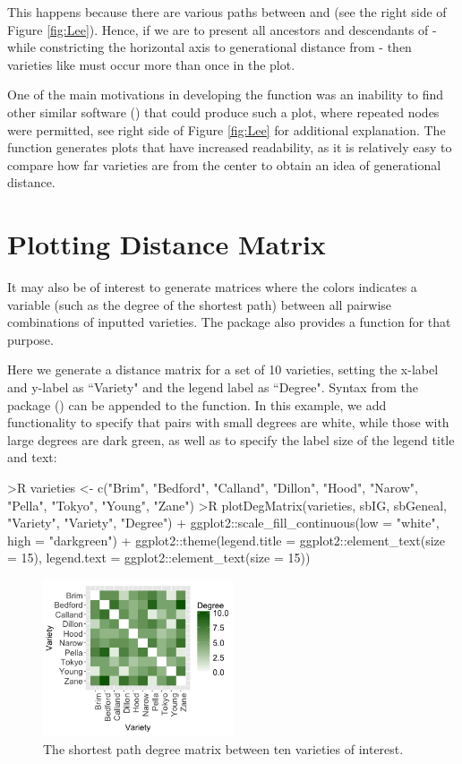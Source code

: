 \documentclass[article,shortnames]{jss}
\begin{document}
This happens because there are various paths between  and  (see the right side of Figure \ref{fig:Lee}). Hence, if we are to present all ancestors and descendants of  - while constricting the horizontal axis to generational distance from  - then varieties like  must occur more than once in the plot.

One of the main motivations in developing the  function was an inability to find other similar software (\citealt{ape}) that could produce such a plot, where repeated nodes were permitted, see right side of Figure \ref{fig:Lee} for additional explanation. The  function generates plots that have increased readability, as it is relatively easy to compare how far varieties are from the center to obtain an idea of generational distance.

\section{Plotting Distance Matrix}

It may also be of interest to generate matrices where the colors indicates a variable (such as the degree of the shortest path) between all pairwise combinations of inputted varieties. The package  also provides a function  for that purpose.

Here we generate a distance matrix for a set of 10 varieties, setting the x-label and y-label as ``Variety" and the legend label as ``Degree". Syntax from the  package (\citealt{ggplot2}) can be appended to the  function. In this example, we add  functionality to specify that pairs with small degrees are white, while those with large degrees are dark green, as well as to specify the label size of the legend title and text:

\begin{Code}
>R varieties <- c("Brim", "Bedford", "Calland", "Dillon", "Hood", "Narow",
  "Pella", "Tokyo", "Young", "Zane")
>R plotDegMatrix(varieties, sbIG, sbGeneal, "Variety", "Variety", "Degree") +
  ggplot2::scale_fill_continuous(low = "white", high = "darkgreen") +
  ggplot2::theme(legend.title = ggplot2::element_text(size = 15),
  legend.text = ggplot2::element_text(size = 15))
\end{Code}

\begin{figure}[h]
    \centering
    \includegraphics[width=0.5\textwidth]{degMatrix}
    \caption{The shortest path degree matrix between ten varieties of interest.}
    \label{fig:degMatrix}
\end{figure}
\end{document}
